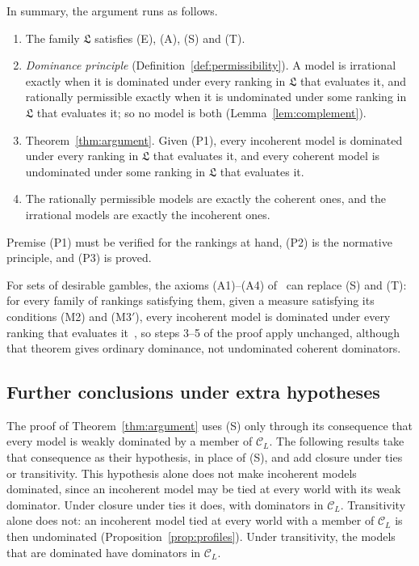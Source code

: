 \documentclass[11pt]{article}
\theoremstyle{definition}
\newcommand{\C}{\mathcal C}
\newcommand{\Lf}{\mathfrak L}
\begin{document}
In summary, the argument runs as follows.
\begin{enumerate}[label=\textbf{(P\arabic*)},leftmargin=*]
\item The family $\Lf$ satisfies (E), (A), (S) and (T).
\item \emph{Dominance principle} (Definition~\ref{def:permissibility}). A model is irrational exactly when it is dominated under every ranking in $\Lf$ that evaluates it, and rationally permissible exactly when it is undominated under some ranking in $\Lf$ that evaluates it; so no model is both (Lemma~\ref{lem:complement}).
\item Theorem~\ref{thm:argument}. Given (P1), every incoherent model is dominated under every ranking in $\Lf$ that evaluates it, and every coherent model is undominated under some ranking in $\Lf$ that evaluates it.
\item[\textbf{(C)}] The rationally permissible models are exactly the coherent ones, and the irrational models are exactly the incoherent ones.
\end{enumerate}
Premise (P1) must be verified for the rankings at hand, (P2) is the normative principle, and (P3) is proved.

For sets of desirable gambles, the axioms (A1)--(A4) of~\cite{KCM} can replace (S) and (T): for every family of rankings satisfying them, given a measure satisfying its conditions (M2) and (M3$'$), every incoherent model is dominated under every ranking that evaluates it~\cite[Theorem~4.1]{KCM}, so steps 3--5 of the proof apply unchanged, although that theorem gives ordinary dominance, not undominated coherent dominators.

\subsection{Further conclusions under extra hypotheses}
The proof of Theorem~\ref{thm:argument} uses (S) only through its consequence that every model is weakly dominated by a member of $\C_L$. The following results take that consequence as their hypothesis, in place of (S), and add closure under ties or transitivity. This hypothesis alone does not make incoherent models dominated, since an incoherent model may be tied at every world with its weak dominator. Under closure under ties it does, with dominators in $\C_L$. Transitivity alone does not: an incoherent model tied at every world with a member of $\C_L$ is then undominated (Proposition~\ref{prop:profiles}). Under transitivity, the models that are dominated have dominators in $\C_L$.
\end{document}
